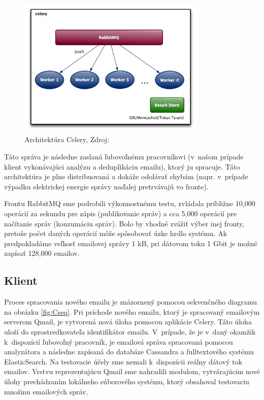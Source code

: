 \documentclass[11pt,twoside,a4paper]{book}
\begin{document}
\begin{figure}[h]
 \centering
 \includegraphics[width=9cm]{./figures/Celery.jpg}
 \caption{Architektúra Celery, Zdroj: \cite{celery}}
 \label{fig:Celery}
\end{figure}
Táto správa je následne zaslaná ľubovoľnému pracovníkovi (v~našom prípade klient vykonávajúci analýzu a deduplikáciu emailu), ktorý ju spracuje. Táto architektúra je plne distribuovaná a dokáže odolávať chybám (napr. v~prípade výpadku elektrickej energie správy naďalej pretrvávajú vo fronte).


Frontu RabbitMQ sme podrobili výkonnostnému testu, zvládala približne 10,000 operácií za sekundu pre zápis (publikovanie správ) a cca 5,000 operácií pre načítanie správ (konzumáciu správ). Bolo by vhodné zvážiť výber inej fronty, pretože počet daných operácií môže spôsobovať úzke hrdlo systému. Ak predpokladáme veľkosť emailovej správy 1 kB, pri dátovom toku 1 Gbit je možné zapísať 128,000 emailov.

\subsection{Klient}

Proces spracovania nového emailu je znázornený pomocou sekvenčného diagramu na obrázku \ref{fig:Cseq}. Pri príchode nového emailu, ktorý je spracovaný emailovým serverom Qmail, je vytvorená nová úloha pomocou aplikácie Celery. Táto úloha uloží do sprostredkovateľa identifikátor emailu. V~prípade, že je v~daný okamžik k~dispozícií ľubovoľný pracovník, je emailová správa spracovaná pomocou analyzátora a následne zapísaná do databáze Cassandra a fulltextového systému ElasticSearch. Na testovacie účely sme nemali k~dispozícii reálny dátový tok emailov. Vrstvu reprezentujúcu Qmail sme nahradili modulom, vytvárajúcim nové úlohy prechádzaním lokálneho súborového systému, ktorý obsahoval testovaciu množinu emailových správ.
\end{document}
